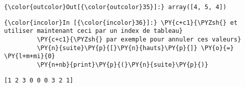 \begin{Verbatim}[commandchars=\\\{\},frame=single,framerule=0.3mm,rulecolor=\color{cellframecolor}]
{\color{outcolor}Out[{\color{outcolor}35}]:} array([4, 5, 4])
\end{Verbatim}
            
    \begin{Verbatim}[commandchars=\\\{\},frame=single,framerule=0.3mm,rulecolor=\color{cellframecolor}]
{\color{incolor}In [{\color{incolor}36}]:} \PY{c+c1}{\PYZsh{} et utiliser maintenant ceci par un index de tableau}
         \PY{c+c1}{\PYZsh{} par exemple pour annuler ces valeurs}
         \PY{n}{suite}\PY{p}{[}\PY{n}{hauts}\PY{p}{]} \PY{o}{=} \PY{l+m+mi}{0}
         \PY{n+nb}{print}\PY{p}{(}\PY{n}{suite}\PY{p}{)}
\end{Verbatim}


    \begin{Verbatim}[commandchars=\\\{\},frame=single,framerule=0.3mm,rulecolor=\color{cellframecolor}]
[1 2 3 0 0 0 3 2 1]
\end{Verbatim}


    
    
    
